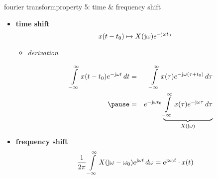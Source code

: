         \begin{frame}{fourier transform}{property 5: time \& frequency shift}
            \begin{itemize}
                \item \textbf{time shift}
                \begin{equation*}\label{eq:fft_timeshift}
                    x(t-t_0) \mapsto X(\mathrm{j}\omega){e}^{-\mathrm{j}\omega t_0} 
                \end{equation*} 
                \pause
                \begin{itemize}
                    \item[]	\textit{derivation}
                    \begin{footnotesize}
                        \begin{eqnarray*}
                            \int\limits_{-\infty}^{\infty} {x(t-t_0) \e^{-\jom t}\, dt} &=& \int\limits_{-\infty}^{\infty} {x(\tau) \e^{-\jom (\tau + t_0)}\, d\tau}\nonumber\\
                            \pause
                            &=& \e^{-\jom t_0}\underbrace{\int\limits_{-\infty}^{\infty} {x(\tau) \e^{-\jom \tau}\, d\tau}}_{X(\jom)}\nonumber\\
                        \end{eqnarray*}
                    \end{footnotesize}
                \end{itemize}
                \pause
                \item \textbf{frequency shift}
                \begin{equation*}
                            \frac{1}{2\pi}\int\limits_{-\infty}^{\infty} X(\mathrm{j}\omega-\omega_0) {e}^{\mathrm{j}\omega t}\, d\omega = {e}^{\mathrm{j}\omega_0 t}\cdot x(t) 		
                \end{equation*} 
            \end{itemize}

        \end{frame}	

